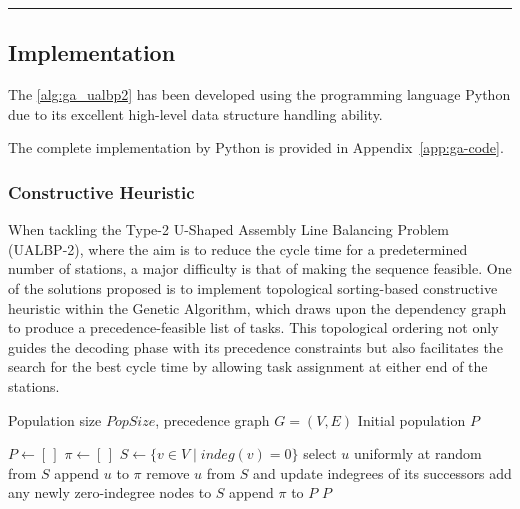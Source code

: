 \documentclass[12pt,a4paper]{article}
\begin{document}
\normalsize
\par\noindent\rule{\linewidth}{0.4pt}
\par\medskip


\par
\subsection{Implementation}

The \cref{alg:ga_ualbp2} has been developed using the programming language Python due to its excellent high-level data structure handling ability.

The complete implementation by Python is provided in Appendix~\cref{app:ga-code}.

\par
\subsubsection{Constructive Heuristic}

When tackling the Type-2 U-Shaped Assembly Line Balancing Problem (UALBP-2), where the aim is to reduce the cycle time for a predetermined number of stations, a major difficulty is that of making the sequence feasible. One of the solutions proposed is to implement topological sorting-based constructive heuristic within the Genetic Algorithm, which draws upon the dependency graph to produce a precedence-feasible list of tasks. This topological ordering not only guides the decoding phase with its precedence constraints but also facilitates the search for the best cycle time by allowing task assignment at either end of the stations.
\begin{algorithm}[H]
\caption{InitializePopulationTopological (Random Topological Sort)}
\label{alg:init_topo}
\begin{algorithmic}[1]
\Require Population size $PopSize$, precedence graph $G=(V,E)$
\Ensure Initial population $P$

\State $P \gets [\,]$
    \State $\pi \gets [\,]$
    \State $S \gets \{v \in V \mid indeg(v)=0\}$ 
        \State select $u$ uniformly at random from $S$
        \State append $u$ to $\pi$
        \State remove $u$ from $S$ and update indegrees of its successors
        \State add any newly zero-indegree nodes to $S$
    \EndWhile
    \State append $\pi$ to $P$
\EndFor
\State \Return $P$
\end{algorithmic}
\end{algorithm}
\end{document}

